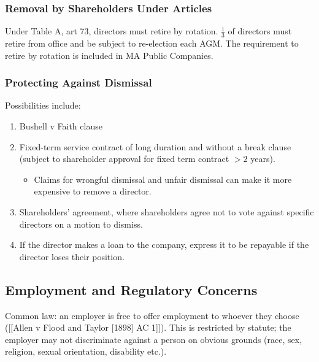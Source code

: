 \documentclass[
]{article}
\providecommand{\tightlist}{%
  \setlength{\itemsep}{0pt}\setlength{\parskip}{0pt}}
\begin{document}
\hypertarget{removal-by-shareholders-under-articles}{%
\subsubsection{Removal by Shareholders Under
Articles}\label{removal-by-shareholders-under-articles}}

Under Table A, art 73, directors must retire by rotation.
\(\frac{1}{3}\) of directors must retire from office and be subject to
re-election each AGM. The requirement to retire by rotation is included
in MA Public Companies.

\hypertarget{protecting-against-dismissal}{%
\subsubsection{Protecting Against
Dismissal}\label{protecting-against-dismissal}}

Possibilities include:

\begin{enumerate}
\def\labelenumi{\arabic{enumi}.}
\tightlist
\item
  Bushell v Faith clause
\item
  Fixed-term service contract of long duration and without a break
  clause (subject to shareholder approval for fixed term contract \(>2\)
  years).

  \begin{itemize}
  \tightlist
  \item
    Claims for wrongful dismissal and unfair dismissal can make it more
    expensive to remove a director.
  \end{itemize}
\item
  Shareholders' agreement, where shareholders agree not to vote against
  specific directors on a motion to dismiss.
\item
  If the director makes a loan to the company, express it to be
  repayable if the director loses their position.
\end{enumerate}

\hypertarget{employment-and-regulatory-concerns}{%
\subsection{Employment and Regulatory
Concerns}\label{employment-and-regulatory-concerns}}

Common law: an employer is free to offer employment to whoever they
choose ({[}{[}Allen v Flood and Taylor {[}1898{]} AC 1{]}{]}). This is
restricted by statute; the employer may not discriminate against a
person on obvious grounds (race, sex, religion, sexual orientation,
disability etc.).
\end{document}
